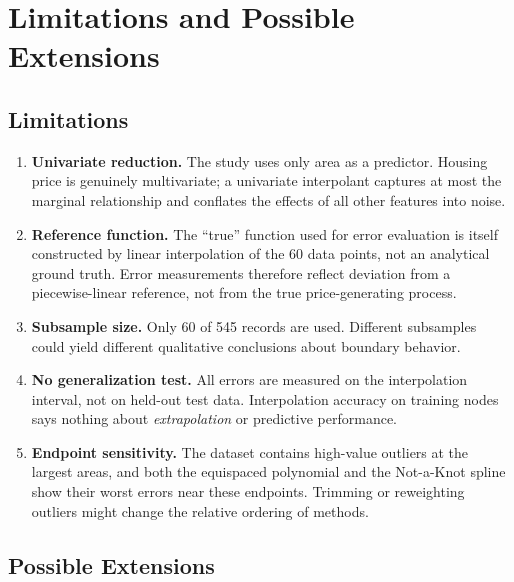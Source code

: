 \documentclass[11pt]{article}
\begin{document}
\section{Limitations and Possible Extensions}

\subsection{Limitations}

\begin{enumerate}
  \item \textbf{Univariate reduction.}  The study uses only area as a
        predictor.  Housing price is genuinely multivariate; a univariate
        interpolant captures at most the marginal relationship and conflates
        the effects of all other features into noise.

  \item \textbf{Reference function.}  The ``true'' function used for error
        evaluation is itself constructed by linear interpolation of the 60
        data points, not an analytical ground truth.  Error measurements
        therefore reflect deviation from a piecewise-linear reference, not
        from the true price-generating process.

  \item \textbf{Subsample size.}  Only 60 of 545 records are used.  Different
        subsamples could yield different qualitative conclusions about boundary
        behavior.

  \item \textbf{No generalization test.}  All errors are measured on the
        interpolation interval, not on held-out test data.  Interpolation
        accuracy on training nodes says nothing about \emph{extrapolation}
        or predictive performance.

  \item \textbf{Endpoint sensitivity.}  The dataset contains high-value
        outliers at the largest areas, and both the equispaced polynomial and
        the Not-a-Knot spline show their worst errors near these endpoints.
        Trimming or reweighting outliers might change the relative ordering of
        methods.
\end{enumerate}

\subsection{Possible Extensions}
\end{document}
